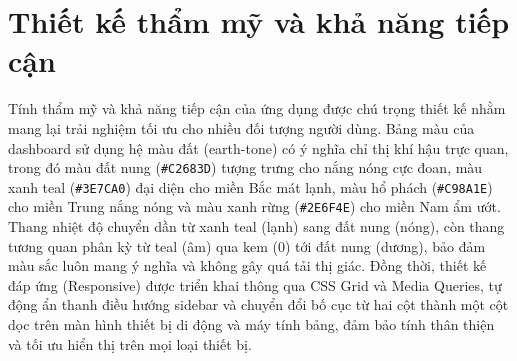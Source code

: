 \section{Thiết kế thẩm mỹ và khả năng tiếp cận}
Tính thẩm mỹ và khả năng tiếp cận của ứng dụng được chú trọng thiết kế nhằm mang lại trải nghiệm tối ưu cho nhiều đối tượng người dùng. Bảng màu của dashboard sử dụng hệ màu đất (earth-tone) có ý nghĩa chỉ thị khí hậu trực quan, trong đó màu đất nung (\texttt{\#C2683D}) tượng trưng cho nắng nóng cực đoan, màu xanh teal (\texttt{\#3E7CA0}) đại diện cho miền Bắc mát lạnh, màu hổ phách (\texttt{\#C98A1E}) cho miền Trung nắng nóng và màu xanh rừng (\texttt{\#2E6F4E}) cho miền Nam ẩm ướt. Thang nhiệt độ chuyển dần từ xanh teal (lạnh) sang đất nung (nóng), còn thang tương quan phân kỳ từ teal (âm) qua kem (0) tới đất nung (dương), bảo đảm màu sắc luôn mang ý nghĩa và không gây quá tải thị giác. Đồng thời, thiết kế đáp ứng (Responsive) được triển khai thông qua CSS Grid và Media Queries, tự động ẩn thanh điều hướng sidebar và chuyển đổi bố cục từ hai cột thành một cột dọc trên màn hình thiết bị di động và máy tính bảng, đảm bảo tính thân thiện và tối ưu hiển thị trên mọi loại thiết bị.

